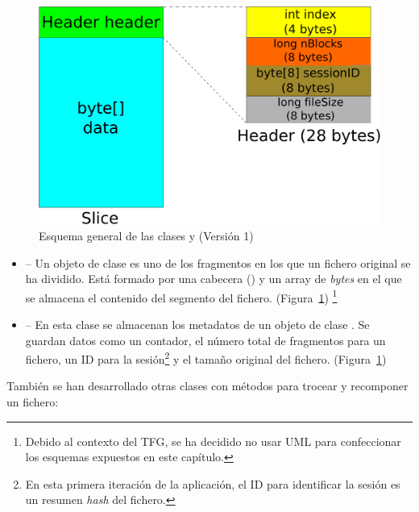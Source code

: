 \begin{figure}[!htb]
  \centering
  \includegraphics[scale=0.4]{Figures/Slice_Header_1}
  \decoRule
  \caption[ -  (Versión 1)]{Esquema general de las clases  y  (Versión 1)}
  \label{fig:Slice_Header_1}
\end{figure}

\begin{itemize}
  \item {} -- Un objeto de clase  es uno de los fragmentos en los que un fichero original se ha dividido. Está formado por una cabecera () y un array de \emph{bytes} en el que se almacena el contenido del segmento del fichero. (Figura~\ref{fig:Slice_Header_1}) \footnote{Debido al contexto del TFG, se ha decidido no usar UML para confeccionar los esquemas expuestos en este capítulo.}

  \item {} -- En esta clase se almacenan los metadatos de un objeto de clase . Se guardan datos como un contador, el número total de fragmentos para un fichero, un ID para la sesión\footnote{En esta primera iteración de la aplicación, el ID para identificar la sesión es un resumen \emph{hash} del fichero.} y el tamaño original del fichero. (Figura~\ref{fig:Slice_Header_1})
\end{itemize}

También se han desarrollado otras clases con métodos para trocear y recomponer un fichero:

